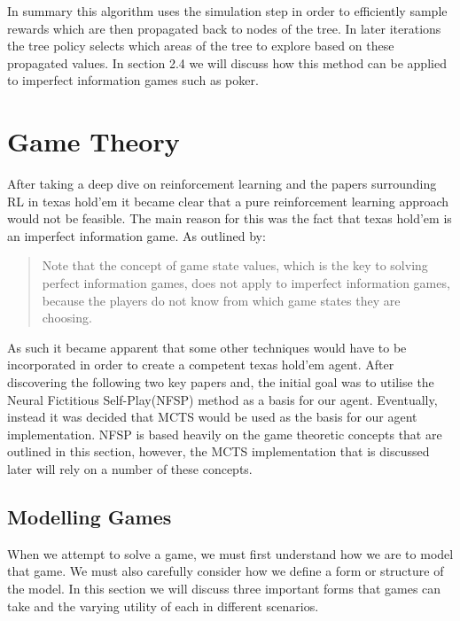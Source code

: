 In summary this algorithm uses the simulation step in order to efficiently sample rewards which
are then propagated back to nodes of the tree.
In later iterations the tree policy selects which areas of the tree to
explore based on these propagated values.
In section 2.4 we will discuss how this method can be applied to imperfect information games such as poker.

\section{Game Theory}\label{sec:gameTheory}
After taking a deep dive on reinforcement learning and the papers surrounding RL in texas hold'em it became
clear that a pure reinforcement learning approach would not be feasible.
The main reason for this was the fact that texas hold'em is an imperfect information game.
As outlined by\citep{dahl2001reinforcement}:
\begin{quotation}
Note that the concept of game state values, which is the key to solving perfect information games,
does not apply to imperfect information games, because the players do not know from  which game states they
are choosing.
\end{quotation}
As such it became apparent that some other techniques would have to be incorporated in order to create a competent
texas hold'em agent.
After discovering the following two key papers\citep{heinrich2016deep} and\citep{heinrich2017reinforcement},
the initial goal was to utilise the Neural Fictitious Self-Play(NFSP) method as a basis for our agent.
Eventually, instead it was decided that MCTS would be used as the basis for our agent implementation.
NFSP is based heavily on the game theoretic concepts that are outlined in this section, however,
the MCTS implementation that is discussed later will rely on a number of these concepts.

\subsection{Modelling Games}\label{subsec:modellingGames}
When we attempt to solve a game, we must first understand how we are to model that game.
We must also carefully consider how we define a form or structure of the model\citep{myerson2013game}.
In this section we will discuss three important forms that games can take and the varying utility
of each in different scenarios.

